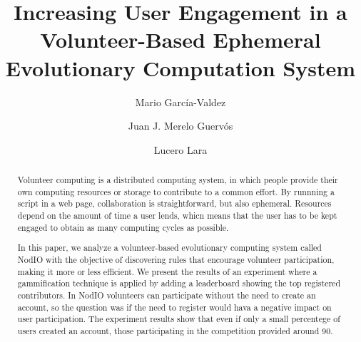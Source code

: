 \documentclass{llncs}
\begin{document}
\sloppy

\title{Increasing User Engagement in a Volunteer-Based Ephemeral Evolutionary Computation System}


\author{Mario Garc\'ia-Valdez \and Juan J. Merelo Guerv\'os \and  Lucero Lara }



\maketitle


\begin{abstract}

Volunteer computing is a distributed computing system, in which people
provide their own computing resources or storage to contribute to a common effort.
By runnning a script in a web page, collaboration is straightforward, but also ephemeral.
Resources depend on the amount of time a user lends, whicn means that 
the user has to be kept engaged to obtain as many computing cycles as
possible.

In this paper, we analyze a volunteer-based evolutionary computing system called
NodIO with the objective of discovering rules that encourage volunteer
participation, making it more or less efficient. We present the results of
an experiment where a gammification technique is applied by adding a leaderboard 
showing the top registered contributors. In NodIO volunteers can
participate without the need to create an account, so the question was
if the need to register would hava a negative impact on user participation. 
The experiment results show that even if only a small percentege of users created an account,
those participating in the competition provided around 90.

\end{abstract}



  
\end{document}
